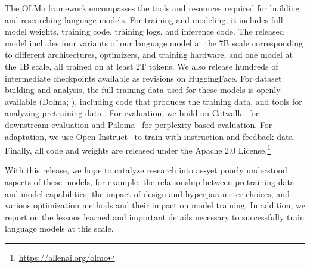 \documentclass[11pt]{article}
\newcommand{\olmo}{OLMo\xspace}
\newcommand{\note}[4][]{\todo[author=#2,color=#3,fancyline,caption={}]{#4}} %
\newcommand{\hanna}[2][]{\note[#1]{\texttt{Hanna}}{red!40}{#2}}
\newcommand{\izcomment}[1]{\textcolor{teal}{\textbf{Iz: #1}}}
\begin{document}


The \olmo framework encompasses the tools and resources required for building and researching language models. For training and modeling, it includes 
full model weights, training code, 
training logs, and inference code. The released model includes four variants of our language model at the 7B scale corresponding to different architectures, optimizers, and training hardware, and one model at the 1B scale, all trained on at least 2T tokens. We also release hundreds of intermediate checkpoints available as revisions on HuggingFace.
For dataset building and analysis, the full training data used for these models is openly available (Dolma; \citealp{dolma}), including code that produces the training data, and tools for analyzing pretraining data  \citep{wimbd}. 
For evaluation, we build on Catwalk~\citep{groeneveld2023catwalk} for downstream evaluation and Paloma~\citep{magnusson2023paloma} for perplexity-based evaluation.
For adaptation, we use Open Instruct~\citep{ivison2023camels,wang2023far} to train with instruction and feedback data. 
Finally, all code and weights are released under the Apache 2.0 License.\footnote{\url{https://allenai.org/olmo}}

With this release, we hope to catalyze research into as-yet poorly understood aspects of these models, for example, the relationship between pretraining data and model capabilities, the impact of design and hyperparameter choices, and various optimization methods and their impact on model training. In addition, we report on the lessons learned and important details necessary to successfully train language models at this scale.



\end{document}
